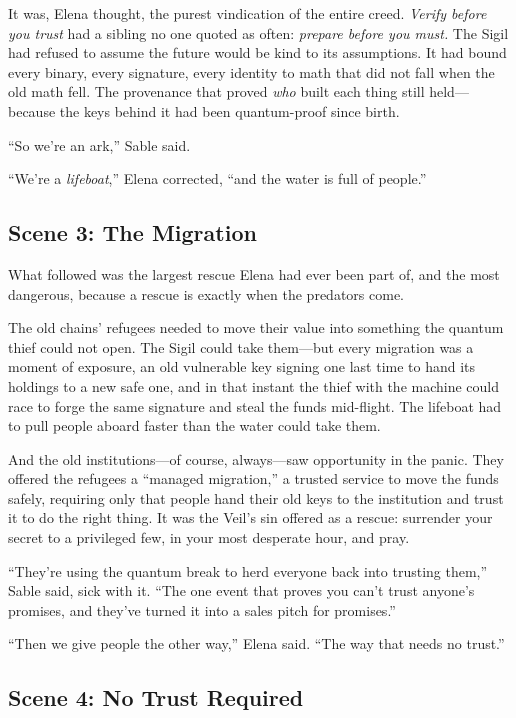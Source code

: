 \documentclass[12pt,letterpaper]{book}
\begin{document}
It was, Elena thought, the purest vindication of the entire creed. \emph{Verify
before you trust} had a sibling no one quoted as often: \emph{prepare before you
must.} The Sigil had refused to assume the future would be kind to its
assumptions. It had bound every binary, every signature, every identity to math
that did not fall when the old math fell. The provenance that proved \emph{who}
built each thing still held---because the keys behind it had been quantum-proof
since birth.

``So we're an ark,'' Sable said.

``We're a \emph{lifeboat},'' Elena corrected, ``and the water is full of people.''

\hypertarget{scene-3-the-migration}{%
\subsection{Scene 3: The
Migration}\label{scene-3-the-migration}}

What followed was the largest rescue Elena had ever been part of, and the most
dangerous, because a rescue is exactly when the predators come.

The old chains' refugees needed to move their value into something the quantum
thief could not open. The Sigil could take them---but every migration was a moment
of exposure, an old vulnerable key signing one last time to hand its holdings to a
new safe one, and in that instant the thief with the machine could race to forge
the same signature and steal the funds mid-flight. The lifeboat had to pull people
aboard faster than the water could take them.

And the old institutions---of course, always---saw opportunity in the panic. They
offered the refugees a ``managed migration,'' a trusted service to move the funds
safely, requiring only that people hand their old keys to the institution and trust
it to do the right thing. It was the Veil's sin offered as a rescue: surrender your
secret to a privileged few, in your most desperate hour, and pray.

``They're using the quantum break to herd everyone back into trusting them,'' Sable
said, sick with it. ``The one event that proves you can't trust anyone's promises,
and they've turned it into a sales pitch for promises.''

``Then we give people the other way,'' Elena said. ``The way that needs no trust.''

\hypertarget{scene-4-no-trust-required}{%
\subsection{Scene 4: No Trust
Required}\label{scene-4-no-trust-required}}
\end{document}
